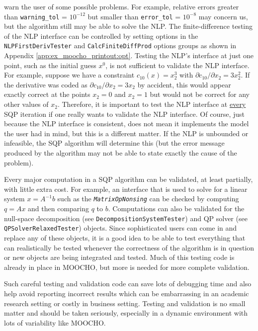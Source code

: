 \documentclass[pdf,ps2pdf,11pt]{SANDreport}
\begin{document}
warn the user of some possible problems.  For example, relative errors greater
than {}\texttt{warning\_tol} = $10^{-12}$ but smaller than
{}\texttt{error\_tol} = $10^{-8}$ may concern us, but the algorithm still may
be able to solve the NLP.  The finite-difference testing of the NLP interface
can be controlled by setting options in the
{}\texttt{NLP\-First\-Deriv\-Tester} and {}\texttt{Calc\-Finite\-Diff\-Prod}
options groups as shown in Appendix {}\ref{app:ex_moocho_printout:opt}.
Testing the NLP's interface at just one point, such as the initial guess
$x^0$, is not sufficient to validate the NLP interface.  For example, suppose
we have a constraint $c_{10}(x) = x_2^3$ with $\partial c_{10} / \partial x_2
= 3 x_2 ^ 2$.  If the derivative was coded as $\partial c_{10} / \partial x_2
= 3 x_2$ by accident, this would appear exactly correct at the points $x_2 =
0$ and $x_2 = 1$ but would not be correct for any other values of $x_2$.
Therefore, it is important to test the NLP interface at {}\underline{every}
SQP iteration if one really wants to validate the NLP interface.  Of course,
just because the NLP interface is consistent, does not mean it implements the
model the user had in mind, but this is a different matter.  If the NLP is
unbounded or infeasible, the SQP algorithm will determine this (but the error
message produced by the algorithm may not be able to state exactly the cause
of the problem).

Every major computation in a SQP algorithm can be validated, at least
partially, with little extra cost.  For example, an interface that is used to
solve for a linear system $x = A^{-1} b$ such as the
{}\texttt{\textit{Matrix\-Op\-Nonsing}} can be checked by computing $q = A x$
and then comparing $q$ to $b$.  Computations can also be validated for the
null-space decomposition (see {}\texttt{Decomposition\-System\-Tester}) and QP
solver (see {}\texttt{QPSolver\-Relaxed\-Tester}) objects.  Since
sophisticated users can come in and replace any of these objects, it is a good
idea to be able to test everything that can realistically be tested whenever
the correctness of the algorithm is in question or new objects are being
integrated and tested.  Much of this testing code is already in place in
MOOCHO, but more is needed for more complete validation.

Such careful testing and validation code can save lots of debugging time and
also help avoid reporting incorrect results which can be embarrassing in an
academic research setting or costly in business setting.  Testing and
validation is no small matter and should be taken seriously, especially in a
dynamic environment with lots of variability like MOOCHO.
\end{document}
